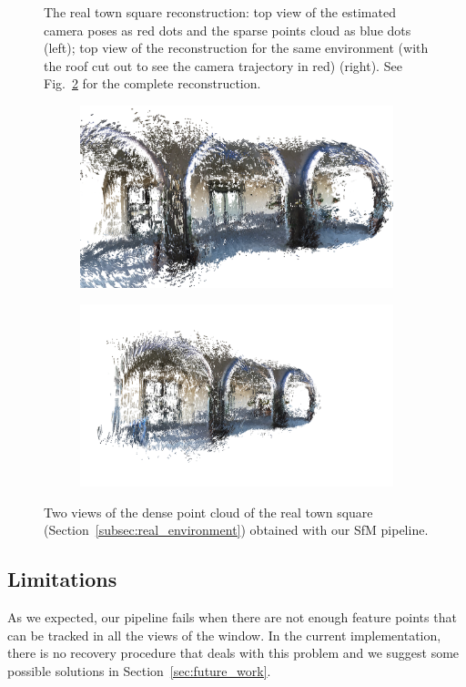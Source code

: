 \begin{figure}[h]
\begin{subfigure}{0.45\linewidth}
	\end{subfigure}
	\caption{The real town square reconstruction: top view of 
	the estimated camera poses as red dots and the sparse
	points cloud as blue dots (left); top view of the reconstruction for the
	same environment (with the roof cut out to see the camera trajectory in red)
	(right). See Fig.~\ref{fig:real_reconstruction} for
	the complete reconstruction.}
	\label{fig:reconstruction_steps}
\end{figure}
%
\begin{figure}[h]
\centering
	\begin{subfigure}{0.8\linewidth}
		\centering
		\includegraphics[width=\linewidth]{img/reconstruction00.png}
	\end{subfigure}
	\begin{subfigure}{0.8\linewidth}
		\centering
		\includegraphics[width=\linewidth]{img/reconstruction01.png}
	\end{subfigure}
	\caption{Two views of the dense point cloud of the real town square
	(Section~\ref{subsec:real_environment}) obtained with our SfM pipeline.}
	\label{fig:real_reconstruction}
\end{figure}

\subsection{Limitations}\label{subsec:limitations}
As we expected, our pipeline fails when there are not enough feature points
that can be tracked in all the views of the window.
In the current implementation, there is no recovery procedure that deals with
this problem and we suggest some possible solutions in
Section~\ref{sec:future_work}.
